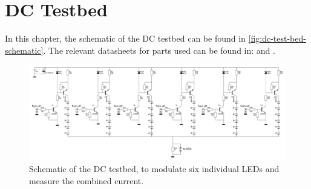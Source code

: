 
\chapter{DC Testbed}
\label{app:dc-test-bed}

In this chapter, the schematic of the DC testbed can be found in \autoref{fig:dc-test-bed-schematic}.
The relevant datasheets for parts used can be found in: \cite{2n3904-npn-transistor-datasheet} and \cite{bc556-pnp-transistor-datasheet}.


\begin{figure}
	\includegraphics[angle=90,width=\textwidth,height=.9\textheight,keepaspectratio]{chapters/appendix/dc-test-bed/dc-test-bed-schematic.jpg}
	\caption{Schematic of the DC testbed, to modulate six individual LEDs and measure the combined current.}
	\label{fig:dc-test-bed-schematic}
\end{figure}

